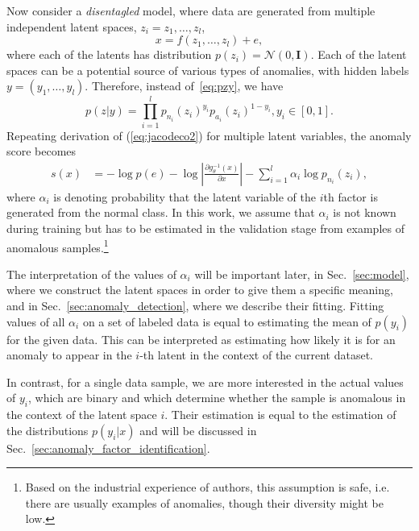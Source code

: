 Now consider a \emph{disentagled} model, where data are generated from multiple independent latent spaces, $z_{i}=z_{1},\ldots,z_{l}$, 
\begin{equation} \label{eq:multilatent}
x=f(z_{1},\ldots,z_{l})+e,
\end{equation}
where each of the latents has distribution $p(z_{i})=\mathcal{N}(0,\mathbf{I})$. Each of the latent spaces can be a potential source of various types of anomalies, with hidden labels  $y=(y_{1},\ldots,y_{l})   $. Therefore, instead of~\eqref{eq:pzy},  we have
\begin{equation} 
p(z\vert y)= \prod_{i=1}^l p_{n_i}(z_i)^{y_i}p_{a_i}(z_i)^{1-y_i},y_i\in[0,1].
\end{equation}
Repeating derivation of (\ref{eq:jacodeco2}) for multiple latent variables, the anomaly score becomes
\begin{align} \label{eq:alphadeco}
s(x) & = - \log p(e) - \log\left\vert \frac{\partial g_{\theta}^{-1}(x)}{\partial x}\right\vert  -  \sum_{i=1}^{l}\alpha_{i}\log p_{n_{i}}(z_{i}),
\end{align}
where $\alpha_{i}$ is denoting probability that the latent variable of the $i$th factor is generated from the normal class. In this work, we assume that $\alpha_i$ is not known during training but has to be estimated in the validation stage from examples of anomalous samples.\footnote{Based on the  industrial experience of authors, this assumption is safe, i.e. there are usually examples of anomalies, though their diversity might be low.}

The interpretation of the values of $\alpha_i$ will be important later, in Sec.~\ref{sec:model}, where we construct the latent spaces in order to give them a specific meaning, and in Sec.~\ref{sec:anomaly_detection}, where we describe their fitting. Fitting values of all $\alpha_i$ on a set of labeled data is equal to estimating the mean of $p(y_i)$ for the given data. This can be interpreted as estimating how likely it is for an anomaly to appear in the $i$-th latent in the context of the current dataset. 

In contrast, for a single data sample, we are more interested in the actual values of $y_i$, which are binary and which determine whether the sample is anomalous in the context of the latent space $i$. Their estimation is equal to the estimation of the distributions $p(y_i \vert x)$ and will be discussed in Sec.~\ref{sec:anomaly_factor_identification}. 

